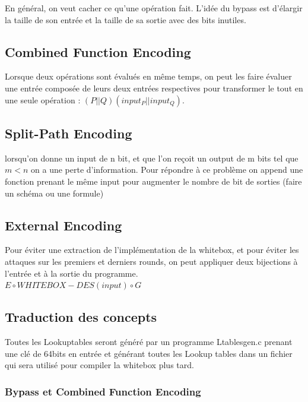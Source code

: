 \documentclass[a4paper,12pt]{article}
\begin{document}
En général, on veut cacher ce qu'une opération fait. L'idée du bypass est d'élargir la taille de son entrée et la taille de sa sortie avec des bits inutiles.


\subsection{Combined Function Encoding}

Lorsque deux opérations sont évalués en même temps, on peut les faire évaluer une entrée composée de leurs deux entrées respectives pour transformer le tout en une seule opération : $(P||Q)(input_P||input_Q)$.

\subsection{Split-Path Encoding}

lorsqu'on donne un input de n bit, et que l'on reçoit un output de m bits tel que $m < n$ on a une perte d'information. Pour répondre à ce problème on append une fonction prenant le même input pour augmenter le nombre de bit de sorties (faire un schéma ou une formule)


\subsection{External Encoding}

Pour éviter une extraction de l'implémentation de la whitebox, et pour éviter les attaques sur les premiers et derniers rounds, on peut appliquer deux bijections à l'entrée et à la sortie du programme.\\

$E \circ WHITEBOX-DES(input) \circ G$

\newpage

\subsection{Traduction des concepts}

Toutes les Lookuptables seront généré par un programme Ltablesgen.c prenant une clé de 64bits en entrée et générant toutes les Lookup tables dans un fichier qui sera utilisé pour compiler la whitebox plus tard.

\subsubsection{Bypass et Combined Function Encoding}
\end{document}
